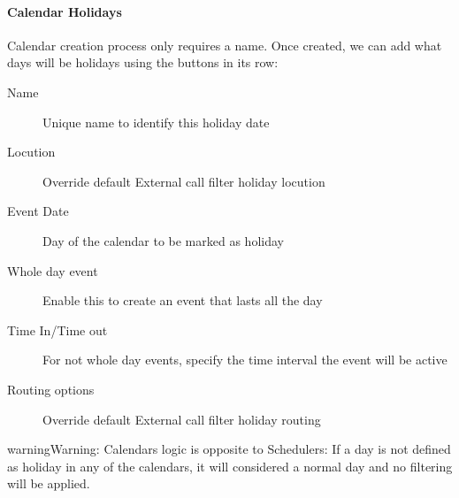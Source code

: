 \documentclass[letterpaper,10pt,english]{sphinxmanual}
\begin{document}
\paragraph{Calendar Holidays}
\label{administration_portal/client/vpbx/routing_tools/calendars:calendar-holidays}
Calendar creation process only requires a name. Once created, we can add what
days will be holidays using the buttons in its row:
\begin{description}
\item[{Name}] \leavevmode{}\label{administration_portal/client/vpbx/routing_tools/calendars:term-name}
Unique name to identify this holiday date

\item[{Locution}] \leavevmode{}\label{administration_portal/client/vpbx/routing_tools/calendars:term-locution}
Override default External call filter holiday locution

\item[{Event Date}] \leavevmode{}\label{administration_portal/client/vpbx/routing_tools/calendars:term-event-date}
Day of the calendar to be marked as holiday

\item[{Whole day event}] \leavevmode{}\label{administration_portal/client/vpbx/routing_tools/calendars:term-whole-day-event}
Enable this to create an event that lasts all the day

\item[{Time In/Time out}] \leavevmode{}\label{administration_portal/client/vpbx/routing_tools/calendars:term-time-in-time-out}
For not whole day events, specify the time interval the event will be active

\item[{Routing options}] \leavevmode{}\label{administration_portal/client/vpbx/routing_tools/calendars:term-routing-options}
Override default External call filter holiday routing

\end{description}

\begin{notice}{warning}{Warning:}
Calendars logic is opposite to Schedulers: If a day is not defined
as holiday in any of the calendars, it will considered a normal day and no
filtering will be applied.
\end{notice}
\end{document}

